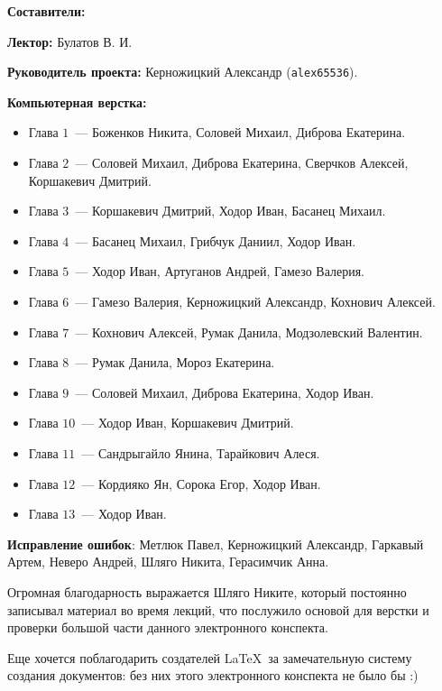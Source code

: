 \documentclass[../main.tex]{subfiles}
\begin{document}
{\Huge \bf Составители:}

\vspace{2em}

{
    \textbf{Лектор:} Булатов В. И.
    
    \smallskip
    
    \textbf{Руководитель проекта:} Керножицкий Александр 
    (\texttt{alex65536}).
    
    \smallskip
    
    \textbf{Компьютерная верстка:}
    \begin{itemize}
     \item Глава $1$~--- Боженков Никита, Соловей Михаил, Диброва Екатерина.
     \item Глава $2$~--- Соловей Михаил, Диброва Екатерина, Сверчков Алексей,
     Коршакевич Дмитрий.
     \item Глава $3$~--- Коршакевич Дмитрий, Ходор Иван, Басанец Михаил.
     \item Глава $4$~--- Басанец Михаил, Грибчук Даниил, Ходор Иван.
     \item Глава $5$~--- Ходор Иван, Артуганов Андрей, Гамезо Валерия.
     \item Глава $6$~--- Гамезо Валерия, Керножицкий Александр,
     Кохнович Алексей.
     \item Глава $7$~--- Кохнович Алексей, Румак Данила, Модзолевский Валентин.
     \item Глава $8$~--- Румак Данила, Мороз Екатерина.
     \item Глава $9$~--- Соловей Михаил, Диброва Екатерина, Ходор Иван.
     \item Глава $10$~--- Ходор Иван, Коршакевич Дмитрий.
     \item Глава $11$~--- Сандрыгайло Янина, Тарайкович Алеся.
     \item Глава $12$~--- Кордияко Ян, Сорока Егор, Ходор Иван.
     \item Глава $13$~--- Ходор Иван.
    \end{itemize}
    
    \textbf{Исправление ошибок}: Метлюк Павел, Керножицкий Александр, Гаркавый
    Артем, Неверо Андрей, Шляго Никита, Герасимчик Анна.
    
    \smallskip
    
    Огромная благодарность выражается Шляго Никите, который постоянно записывал
    материал во время лекций, что послужило основой для верстки и проверки
    большой части данного электронного конспекта.
    
    
    \smallskip
    
    Еще хочется поблагодарить создателей \LaTeX\ за замечательную 
    систему создания документов: без них этого электронного 
    конспекта не было бы :)
}

\pagebreak
\end{document}
